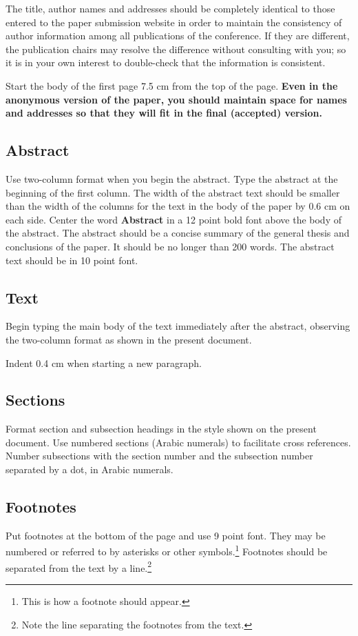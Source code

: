 \documentclass[11pt,a4paper]{article}
\begin{document}
The title, author names and addresses should be completely identical to those entered to the paper submission website in order to maintain the consistency of author information among all publications of the conference.
If they are different, the publication chairs may resolve the difference without consulting with you; so it is in your own interest to double-check that the information is consistent.

Start the body of the first page 7.5 cm from the top of the page.
\textbf{Even in the anonymous version of the paper, you should maintain space for names and addresses so that they will fit in the final (accepted) version.}


\subsection{Abstract}
Use two-column format when you begin the abstract.
Type the abstract at the beginning of the first column.
The width of the abstract text should be smaller than the
width of the columns for the text in the body of the paper by 0.6 cm on each side.
Center the word \textbf{Abstract} in a 12 point bold font above the body of the abstract.
The abstract should be a concise summary of the general thesis and conclusions of the paper.
It should be no longer than 200 words.
The abstract text should be in 10 point font.

\subsection{Text}
Begin typing the main body of the text immediately after the abstract, observing the two-column format as shown in the present document.

Indent 0.4 cm when starting a new paragraph.

\subsection{Sections}

Format section and subsection headings in the style shown on the present document.
Use numbered sections (Arabic numerals) to facilitate cross references.
Number subsections with the section number and the subsection number separated by a dot, in Arabic numerals.

\subsection{Footnotes}
Put footnotes at the bottom of the page and use 9 point font.
They may be numbered or referred to by asterisks or other symbols.\footnote{This is how a footnote should appear.}
Footnotes should be separated from the text by a line.\footnote{Note the line separating the footnotes from the text.}
\end{document}
